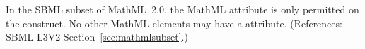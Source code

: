 In the SBML subset of MathML~2.0, the MathML attribute
 is only permitted on the  construct.
No other MathML elements may have a  attribute.
(References: SBML L3V2 Section~\ref{sec:mathmlsubset}.)
